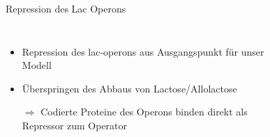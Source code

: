 \documentclass[11pt,aspectratio=169,reqno]{beamer}
\begin{document}
\begin{frame}{Repression des Lac Operons}
\begin{columns}

    \begin{itemize}
        \item Repression des lac-operons aus Ausgangspunkt für unser Modell
        \item Überspringen des Abbaus von Lactose/Allolactose
        \item[$\Rightarrow$] Codierte Proteine des Operons binden direkt als Repressor zum Operator
    \end{itemize}
    
    \begin{figure}
        \centering
    \end{figure}
\end{columns}
\end{frame}
\end{document}
